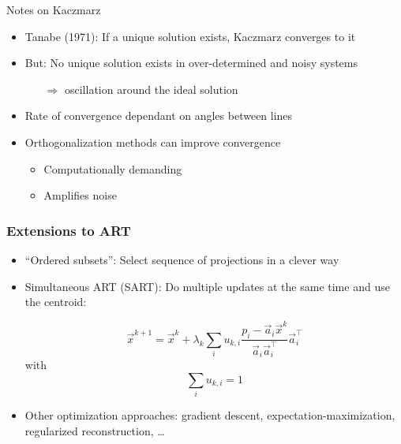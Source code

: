 \begin{frame}[t]{Notes on Kaczmarz}

	\begin{itemize}
		\setlength\itemsep{0.3cm}
		\item Tanabe (1971): If a unique solution exists, Kaczmarz converges to it
		\item But: No unique solution exists in over-determined and noisy systems
		      \begin{itemize}
			      \item[$\Rightarrow$] oscillation around the ideal solution
		      \end{itemize}
		\item Rate of convergence dependant on angles between lines
		\item Orthogonalization methods can improve convergence
		      \begin{itemize}
			      \item Computationally demanding
			      \item Amplifies noise
		      \end{itemize}
	\end{itemize}

\end{frame}

\begin{frame}
	\frametitle{Extensions to ART}

	\begin{itemize}
		\item ``Ordered subsets'': Select sequence of projections in a clever way
		\item Simultaneous ART (SART): Do multiple updates at the same time and use the centroid:

		      \begin{equation}
			      \vec{x}^{k+1} = \vec{x}^k + \lambda_k \sum_{i} u_{k,i} \frac{p_i - \vec{a}_i\vec{x}^k}{\vec{a}_i\vec{a}^\top_i}\vec{a}^\top_i
		      \end{equation}
		      with
		      \begin{equation}
			      \sum_{i}u_{k,i} = 1
		      \end{equation}

		\item Other optimization approaches: gradient descent, expectation-maximization, regularized reconstruction, \ldots
	\end{itemize}

\end{frame}


